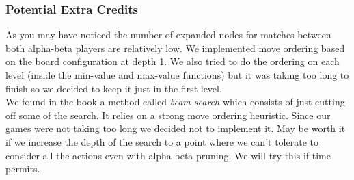 \documentclass[11pt]{article}
\begin{document}
\subsubsection*{Potential Extra Credits}
As you may have noticed the number of expanded nodes for matches between both alpha-beta players are relatively low. We implemented move ordering based on the board configuration at depth 1. We also tried to do the ordering  on each level (inside the min-value and max-value functions) but it was taking too long to finish so we decided to keep it just in the first level.\\

We found in the book a method called \textit{beam search} which consists of just cutting off some of the search. It relies on a strong move ordering heuristic. Since our games were not taking too long we decided not to implement it. May be worth it if we increase the depth of the search to a point where we can't tolerate to consider all the actions even with alpha-beta pruning. We will try this if time permits.\\
\end{document}
